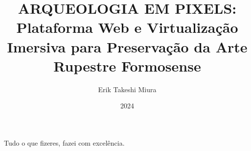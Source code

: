 \documentclass[pt,twoside,onehalfspacing,bsc]{ifgtcc}
\title{
ARQUEOLOGIA EM PIXELS:
Plataforma Web e Virtualização Imersiva para 
Preservação da Arte Rupestre Formosense 
}
\date{2024}
\author{Erik Takeshi Miura}
\begin{document}
\frontmatter
\frontpage
\presentationpage

\begin{fichacatalografica}
\FakeFichaCatalografica %
%
\end{fichacatalografica}

\begin{dedicatory}
Tudo o que fizeres, fazei com excelência.
\end{dedicatory}

\acknowledgements
% 



\resumo


\abstract


\tableofcontents

\listoffigures
\listoftables
\printglossary[type=\acronymtype, title={Acrônimos}] %
\printglossary %

\mainmatter








\begin{references}

\end{references}

\theappendix

\end{document}
